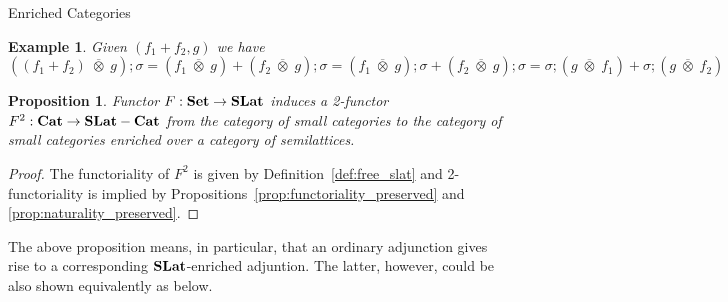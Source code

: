 \documentclass[acmsmall, screen, nonacm]{acmart}
\newtheorem{example}[theorem]{Example}
\newtheorem{proposition}[theorem]{Proposition}
\begin{document}
\begin{section}{Enriched Categories}
\begin{example}
Given $(f_1 + f_2, g)$ we have $((f_1 + f_2) \;\overline{\otimes}\; g);\sigma = (f_1 \;\overline{\otimes}\; g) + (f_{2} \;\overline{\otimes}\; g);\sigma = (f_{1} \;\overline{\otimes}\; g);\sigma + (f_{2} \;\overline{\otimes}\; g);\sigma = \sigma;(g \;\overline{\otimes}\; f_{1}) + \sigma;(g \;\overline{\otimes}\; f_{2})$

\end{example}


\begin{proposition}
Functor $F : \mathbf{Set} \to \mathbf{SLat}$ induces a 2-functor $F^{2}: \mathbf{Cat} \to \mathbf{SLat}-\mathbf{Cat}$ from the category of small categories to the category of small categories enriched over a category of semilattices.
\end{proposition}
\begin{proof}
  The functoriality of $F^{2}$ is given by Definition~\ref{def:free_slat} and 2-functoriality is implied by Propositions~\ref{prop:functoriality_preserved} and \ref{prop:naturality_preserved}.
\end{proof}

The above proposition means, in particular, that an ordinary adjunction gives rise to a corresponding $\mathbf{SLat}$-enriched adjuntion.
The latter, however, could be also shown equivalently as below.


\end{section}
\end{document}
